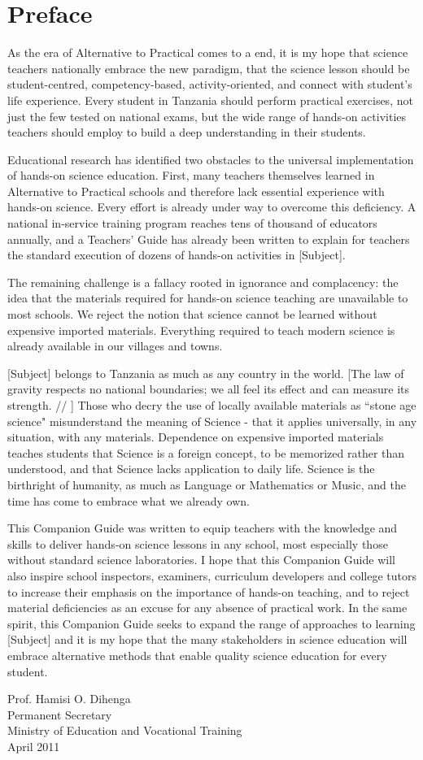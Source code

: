 \chapter*{Preface}

As the era of Alternative to Practical comes to a end, it is my hope 
that science teachers nationally embrace the new paradigm, that the science lesson 
should be student-centred, competency-based, activity-oriented, and connect 
with student's life experience. Every student in Tanzania should perform practical exercises, not just the few tested on national exams, but the wide range of hands-on activities teachers should employ to build a deep understanding in their students.

Educational research has identified two obstacles to the universal 
implementation of hands-on science education. First, many teachers themselves learned 
in Alternative to Practical schools and therefore lack essential experience 
with hands-on science. Every effort is already under way to overcome 
this deficiency. A national in-service training program reaches tens of thousand of educators annually, and a Teachers' Guide has already been written to explain for teachers the standard execution of dozens of hands-on activities in [Subject].

The remaining challenge is a fallacy rooted in ignorance and complacency: the idea that the materials required for hands-on science teaching are unavailable to most schools. We reject the notion that science cannot be learned without expensive imported materials. Everything required 
to teach modern science is already available in our villages and towns. 

[Subject] belongs to Tanzania as much as any country in the world. [The 
law of gravity respects no national boundaries; we all feel its effect 
and can measure its strength. // ] Those who decry the use of locally 
available materials as ``stone age science" misunderstand the meaning 
of Science - that it applies universally, in any situation, with any materials. 
Dependence on expensive imported materials teaches students that Science is a foreign 
concept, to be memorized rather than understood, and that Science lacks 
application to daily life. Science is the birthright of humanity, 
as much as Language or Mathematics or Music, and the time has come to 
embrace what we already own.

This Companion Guide was written to equip teachers with the knowledge and skills to deliver 
hands-on science lessons in any school, most especially those without standard science laboratories. I hope that this Companion Guide will also inspire school inspectors, examiners, curriculum developers and college tutors to increase their emphasis on the importance of hands-on teaching, and to reject material deficiencies as an excuse for any absence of practical work. In the same spirit, this Companion Guide seeks to expand the range of approaches to learning [Subject] and it is my hope that the many stakeholders in science education will embrace alternative methods that enable quality science education for every student.


Prof. Hamisi O. Dihenga\\
Permanent Secretary\\
Ministry of Education and Vocational Training\\
April 2011

